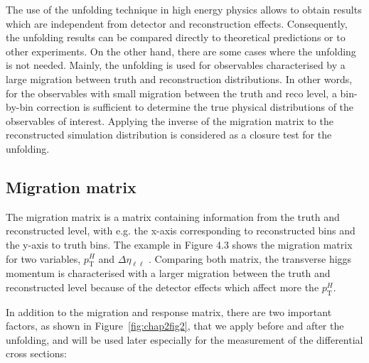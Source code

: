 The use of the unfolding technique in high energy physics allows to obtain results which are independent from detector and reconstruction effects. Consequently, the unfolding results can be compared directly to theoretical predictions or to other experiments. On the other hand, there are some cases where the unfolding is not needed. Mainly, the unfolding is used for observables characterised by a large migration between truth and reconstruction distributions. In other words, for the observables with small migration between the truth and reco level, a bin-by-bin correction is sufficient to determine the true physical distributions of the observables of interest. Applying the inverse of the migration matrix to the reconstructed simulation distribution is considered as a closure test for the unfolding.

\subsection{Migration matrix}


The migration matrix is a matrix containing information from the truth and reconstructed level, with e.g. the x-axis corresponding to reconstructed bins and the y-axis to truth bins. The example in Figure 4.3 shows the migration matrix for two variables, $p_\mathrm{T}^{H}$ and $\Delta \eta_{\ell \ell}$ . Comparing both matrix, the transverse higgs momentum is characterised with a larger migration between the truth and reconstructed level because of the detector effects which affect more the $p_\mathrm{T}^{H}$.

In addition to the migration and response matrix, there are two important factors, as shown in Figure~\ref{fig:chap2fig2}, that we apply before and after the unfolding, and will be used later especially for the measurement of the differential cross sections:

